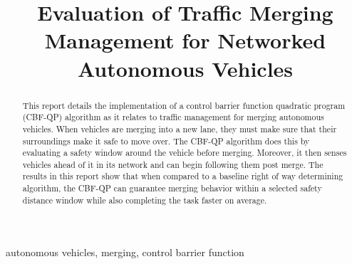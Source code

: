 \documentclass[conference]{IEEEtran}
\begin{document}
\title{Evaluation of Traffic Merging Management for Networked Autonomous Vehicles\\
}

\author{
\and
{}
}

\maketitle

\begin{abstract}
This report details the implementation of a control barrier function quadratic program (CBF-QP) algorithm as it relates to traffic management for merging autonomous vehicles. When vehicles are merging into a new lane, they must make sure that their surroundings make it safe to move over. The CBF-QP algorithm does this by evaluating a safety window around the vehicle before merging. Moreover, it then senses vehicles ahead of it in its network and can begin following them post merge. The results in this report show that when compared to a baseline right of way determining algorithm, the CBF-QP can guarantee merging behavior within a selected safety distance window while also completing the task faster on average.
\end{abstract}

\begin{IEEEkeywords}
autonomous vehicles, merging, control barrier function
\end{IEEEkeywords}
\end{document}
